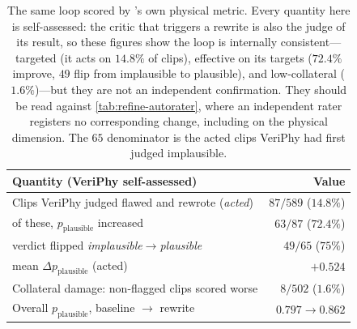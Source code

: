 
\begin{table}[t]
\centering\small
\renewcommand{\arraystretch}{1.2}
\begin{tabular}{@{}p{9.6cm} r@{}}
\toprule
\textbf{Quantity (VeriPhy self-assessed)} & \textbf{Value} \\
\midrule
Clips VeriPhy judged flawed and rewrote (\emph{acted})   & $87/589$ \;($14.8\%$) \\
\quad of these, $p_{\text{plausible}}$ increased          & $63/87$ \;($72.4\%$) \\
\quad verdict flipped \emph{implausible}$\to$\emph{plausible} & $49/65$ \;($75\%$) \\
\quad mean $\Delta p_{\text{plausible}}$ (acted)          & $+0.524$ \\
Collateral damage: non-flagged clips scored worse         & $8/502$ \;($1.6\%$) \\
Overall $p_{\text{plausible}}$, baseline $\to$ rewrite     & $0.797 \to 0.862$ \\
\bottomrule
\end{tabular}
\caption{The same loop scored by \PhyReAct{}'s own physical metric. Every quantity
here is self-assessed: the critic that triggers a rewrite is also the judge of its
result, so these figures show the loop is internally consistent---targeted (it acts on
$14.8\%$ of clips), effective on its targets ($72.4\%$ improve, $49$ flip from
implausible to plausible), and low-collateral ($1.6\%$)---but they are not an
independent confirmation. They should be read against \cref{tab:refine-autorater},
where an independent rater registers no corresponding change, including on the
physical dimension. The $65$ denominator is the acted clips VeriPhy had first judged
implausible.}
\label{tab:refine-selfmetric}
\end{table}

